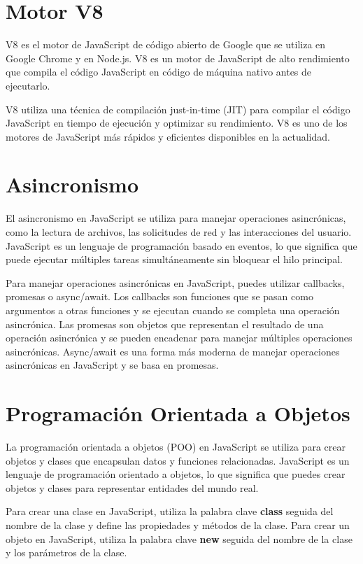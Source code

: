 \documentclass[
  a4paper,
  DIV=11,
  numbers=noendperiod,
  onepage,
  openany]{scrreprt}
\begin{document}
\begin{tcolorbox}
\section{Motor V8}\label{motor-v8}

V8 es el motor de JavaScript de código abierto de Google que se utiliza
en Google Chrome y en Node.js. V8 es un motor de JavaScript de alto
rendimiento que compila el código JavaScript en código de máquina nativo
antes de ejecutarlo.

V8 utiliza una técnica de compilación just-in-time (JIT) para compilar
el código JavaScript en tiempo de ejecución y optimizar su rendimiento.
V8 es uno de los motores de JavaScript más rápidos y eficientes
disponibles en la actualidad.

\section{Asincronismo}\label{asincronismo}

El asincronismo en JavaScript se utiliza para manejar operaciones
asincrónicas, como la lectura de archivos, las solicitudes de red y las
interacciones del usuario. JavaScript es un lenguaje de programación
basado en eventos, lo que significa que puede ejecutar múltiples tareas
simultáneamente sin bloquear el hilo principal.

Para manejar operaciones asincrónicas en JavaScript, puedes utilizar
callbacks, promesas o async/await. Los callbacks son funciones que se
pasan como argumentos a otras funciones y se ejecutan cuando se completa
una operación asincrónica. Las promesas son objetos que representan el
resultado de una operación asincrónica y se pueden encadenar para
manejar múltiples operaciones asincrónicas. Async/await es una forma más
moderna de manejar operaciones asincrónicas en JavaScript y se basa en
promesas.

\section{Programación Orientada a
Objetos}\label{programaciuxf3n-orientada-a-objetos-1}

La programación orientada a objetos (POO) en JavaScript se utiliza para
crear objetos y clases que encapsulan datos y funciones relacionadas.
JavaScript es un lenguaje de programación orientado a objetos, lo que
significa que puedes crear objetos y clases para representar entidades
del mundo real.

Para crear una clase en JavaScript, utiliza la palabra clave
\textbf{class} seguida del nombre de la clase y define las propiedades y
métodos de la clase. Para crear un objeto en JavaScript, utiliza la
palabra clave \textbf{new} seguida del nombre de la clase y los
parámetros de la clase.


\end{tcolorbox}
\end{document}
